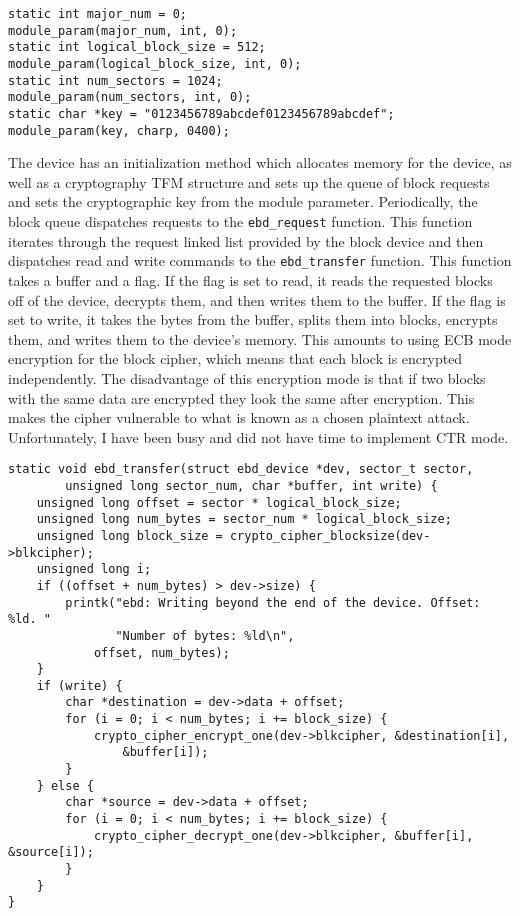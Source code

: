 \documentclass[10pt,conference,draftclsnofoot,onecolumn]{IEEEtran}
\begin{document}
\begin{lstlisting}
static int major_num = 0;
module_param(major_num, int, 0);
static int logical_block_size = 512;
module_param(logical_block_size, int, 0);
static int num_sectors = 1024;
module_param(num_sectors, int, 0);
static char *key = "0123456789abcdef0123456789abcdef";
module_param(key, charp, 0400);
\end{lstlisting}


The device has an initialization method which allocates memory for the device, as well as a cryptography TFM structure and sets up the queue of block requests and sets the cryptographic key from the module parameter. Periodically, the block queue dispatches requests to the \texttt{ebd\_request} function. This function iterates through the request linked list provided by the block device and then dispatches read and write commands to the \texttt{ebd\_transfer} function. This function takes a buffer and a flag. If the flag is set to read, it reads the requested blocks off of the device, decrypts them, and then writes them to the buffer. If the flag is set to write, it takes the bytes from the buffer, splits them into blocks, encrypts them, and writes them to the device's memory. This amounts to using ECB mode encryption for the block cipher, which means that each block is encrypted independently. The disadvantage of this encryption mode is that if two blocks with the same data are encrypted they look the same after encryption. This makes the cipher vulnerable to what is known as a chosen plaintext attack. Unfortunately, I have been busy and did not have time to implement CTR mode.

\begin{lstlisting}
static void ebd_transfer(struct ebd_device *dev, sector_t sector,
        unsigned long sector_num, char *buffer, int write) {
    unsigned long offset = sector * logical_block_size;
    unsigned long num_bytes = sector_num * logical_block_size;
    unsigned long block_size = crypto_cipher_blocksize(dev->blkcipher);
    unsigned long i;
    if ((offset + num_bytes) > dev->size) {
        printk("ebd: Writing beyond the end of the device. Offset: %ld. "
               "Number of bytes: %ld\n",
            offset, num_bytes);
    }
    if (write) {
        char *destination = dev->data + offset;
        for (i = 0; i < num_bytes; i += block_size) {
            crypto_cipher_encrypt_one(dev->blkcipher, &destination[i],
                &buffer[i]);
        }
    } else {
        char *source = dev->data + offset;
        for (i = 0; i < num_bytes; i += block_size) {
            crypto_cipher_decrypt_one(dev->blkcipher, &buffer[i], &source[i]);
        }
    }
}
\end{lstlisting}
\end{document}
